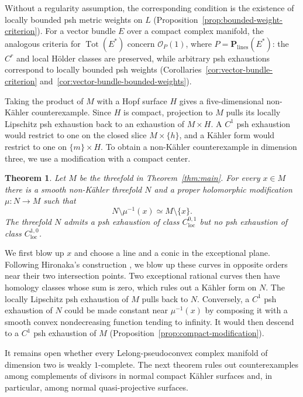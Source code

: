 \documentclass[11pt]{amsart}
\newtheorem{theorem}{Theorem}[section]
\theoremstyle{definition}
\theoremstyle{remark}
\numberwithin{equation}{section}
\newcommand{\PP}{\mathbf P}
\newcommand{\OO}{\mathcal O}
\newcommand{\Tot}{\operatorname{Tot}}
\begin{document}
Without a regularity assumption, the corresponding condition
is the existence of locally bounded psh metric weights on $L$
(Proposition~\ref{prop:bounded-weight-criterion}).
For a vector bundle $E$ over a compact complex manifold,
the analogous criteria for $\Tot(E^*)$ concern $\OO_P(1)$,
where $P=\PP_{\mathrm{lines}}(E^*)$: the $C^r$ and local
H\"older classes are preserved, while arbitrary psh exhaustions
correspond to locally bounded psh weights
(Corollaries~\ref{cor:vector-bundle-criterion}
and~\ref{cor:vector-bundle-bounded-weights}).

Taking the product of $M$ with a Hopf surface $H$ gives a
five-dimensional non-K\"ahler counterexample. Since $H$ is compact,
projection to $M$ pulls its locally Lipschitz psh exhaustion back to
an exhaustion of $M\times H$. A $C^1$ psh exhaustion would restrict
to one on the closed slice $M\times\{h\}$, and a K\"ahler form would
restrict to one on $\{m\}\times H$. To obtain a non-K\"ahler
counterexample in dimension three, we use a modification with a
compact center.

\begin{theorem}\label{thm:nonkahler-threefold}
Let $M$ be the threefold in Theorem~\ref{thm:main}.
For every $x\in M$ there is a smooth non-K\"ahler threefold $N$ and a
proper holomorphic modification $\mu:N\to M$ such that
\[
N\setminus\mu^{-1}(x)\simeq M\setminus\{x\}.
\]
The threefold $N$ admits a psh exhaustion of class $C^{0,1}_{\mathrm{loc}}$
but no psh exhaustion of class $C^{1,0}_{\mathrm{loc}}$.
\end{theorem}

We first blow up $x$ and choose a line and a conic in the exceptional
plane. Following Hironaka's construction \cite[\S6]{Barlet2015}, we
blow up these curves in opposite orders near their two intersection
points. Two exceptional rational curves then have homology classes
whose sum is zero, which rules out a K\"ahler form on $N$.
The locally Lipschitz psh exhaustion of $M$ pulls back to $N$.
Conversely, a $C^1$ psh exhaustion of $N$ could be made constant
near $\mu^{-1}(x)$ by composing it with a smooth convex nondecreasing
function tending to infinity. It would then descend to a $C^1$ psh
exhaustion of $M$ (Proposition~\ref{prop:compact-modification}).

It remains open whether every Lelong-pseudoconvex complex manifold of
dimension two is weakly $1$-complete. The next theorem rules
out counterexamples among complements of divisors in normal compact
K\"ahler surfaces and, in particular, among normal quasi-projective
surfaces.
\end{document}
